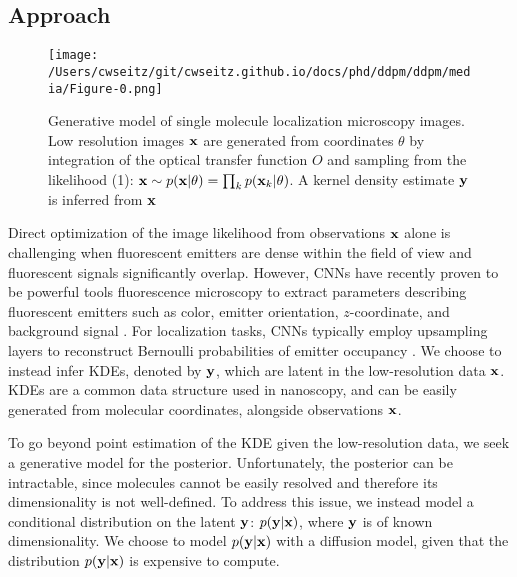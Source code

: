 \subsection{Approach}

\begin{figure}[t]
\centering
\texttt{[image: /Users/cwseitz/git/cwseitz.github.io/docs/phd/ddpm/ddpm/media/Figure-0.png]}
\caption{Generative model of single molecule localization microscopy images. Low resolution images $\bold{x}$ are generated from coordinates $\theta$ by integration of the optical transfer function $O$ and sampling from the likelihood (1): $\bold{x}\sim p(\bold{x}\lvert\theta) = \prod_{k} p(\bold{x}_k\lvert\theta)$. A kernel density estimate $\bold{y}$ is inferred from $\bold{x}$}
\label{fig:fig60}
\end{figure}


Direct optimization of the image likelihood from observations $\bold{x}$ alone is challenging when fluorescent emitters are dense within the field of view and fluorescent signals significantly overlap. However, CNNs have recently proven to be powerful tools fluorescence microscopy to extract parameters describing fluorescent emitters such as color, emitter orientation, $z$-coordinate, and background signal \cite{Zhang2018,Kim2019,Zelger2018}. For localization tasks, CNNs typically employ upsampling layers to reconstruct Bernoulli probabilities of emitter occupancy \parencite{Speiser2021,Nehme2020}. We choose to instead infer KDEs, denoted by $\bold{y}$, which are latent in the low-resolution data $\bold{x}$. KDEs are a common data structure used in nanoscopy, and can be easily generated from molecular coordinates, alongside observations $\bold{x}$.

To go beyond point estimation of the KDE given the low-resolution data, we seek a generative model for the posterior. Unfortunately, the posterior can be intractable, since molecules cannot be easily resolved and therefore its dimensionality is not well-defined. To address this issue, we instead model a conditional distribution on the latent $\bold{y}$: $p(\bold{y}\lvert\bold{x})$, where $\bold{y}$ is of known dimensionality. We choose to model $p(\bold{y}\lvert\bold{x})$ with a diffusion model, given that the distribution $p(\bold{y}\lvert\bold{x})$ is expensive to compute.


